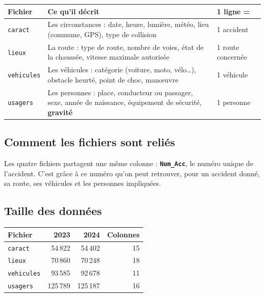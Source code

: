 \documentclass[11pt,a4paper]{article}
\begin{document}
\begin{center}
\begin{tabularx}{\linewidth}{@{}l X l@{}}
  \toprule
  \textbf{Fichier} & \textbf{Ce qu'il décrit} & \textbf{1 ligne =} \\
  \midrule
  \texttt{caract}    & Les circonstances : date, heure, lumière, météo, lieu (commune, GPS), type de collision & 1 accident \\
  \texttt{lieux}     & La route : type de route, nombre de voies, état de la chaussée, vitesse maximale autorisée & 1 route concernée \\
  \texttt{vehicules} & Les véhicules : catégorie (voiture, moto, vélo\dots), obstacle heurté, point de choc, manœuvre & 1 véhicule \\
  \texttt{usagers}   & Les personnes : place, conducteur ou passager, sexe, année de naissance, équipement de sécurité, \textbf{gravité} & 1 personne \\
  \bottomrule
\end{tabularx}
\end{center}

\subsection{Comment les fichiers sont reliés}

Les quatre fichiers partagent une même colonne : \textbf{\texttt{Num\_Acc}},
le numéro unique de l'accident. C'est grâce à ce numéro qu'on peut retrouver,
pour un accident donné, sa route, ses véhicules et les personnes impliquées.

\subsection{Taille des données}

\begin{center}
\begin{tabular}{@{}l r r r@{}}
  \toprule
  \textbf{Fichier} & \textbf{2023} & \textbf{2024} & \textbf{Colonnes} \\
  \midrule
  \texttt{caract}    &  54\,822 &  54\,402 & 15 \\
  \texttt{lieux}     &  70\,860 &  70\,248 & 18 \\
  \texttt{vehicules} &  93\,585 &  92\,678 & 11 \\
  \texttt{usagers}   & 125\,789 & 125\,187 & 16 \\
  \bottomrule
\end{tabular}
\end{center}
\end{document}
